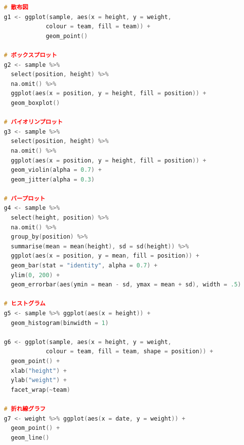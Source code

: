 \begin{lstlisting}[language=c++,label={code:03_01},caption={ggplot2による描画コード}]
# 散布図
g1 <- ggplot(sample, aes(x = height, y = weight, 
			colour = team, fill = team)) +
  			geom_point()

# ボックスプロット
g2 <- sample %>%
  select(position, height) %>%
  na.omit() %>%
  ggplot(aes(x = position, y = height, fill = position)) +
  geom_boxplot()

# バイオリンプロット
g3 <- sample %>%
  select(position, height) %>%
  na.omit() %>%
  ggplot(aes(x = position, y = height, fill = position)) +
  geom_violin(alpha = 0.7) +
  geom_jitter(alpha = 0.3)

# バープロット
g4 <- sample %>%
  select(height, position) %>%
  na.omit() %>%
  group_by(position) %>%
  summarise(mean = mean(height), sd = sd(height)) %>%
  ggplot(aes(x = position, y = mean, fill = position)) +
  geom_bar(stat = "identity", alpha = 0.7) +
  ylim(0, 200) +
  geom_errorbar(aes(ymin = mean - sd, ymax = mean + sd), width = .5)
  
# ヒストグラム
g5 <- sample %>% ggplot(aes(x = height)) +
  geom_histogram(binwidth = 1)

g6 <- ggplot(sample, aes(x = height, y = weight, 
            colour = team, fill = team, shape = position)) +
  geom_point() +
  xlab("height") +
  ylab("weight") +
  facet_wrap(~team)

# 折れ線グラフ
g7 <- weight %>% ggplot(aes(x = date, y = weight)) +
  geom_point() +
  geom_line()
\end{lstlisting}

